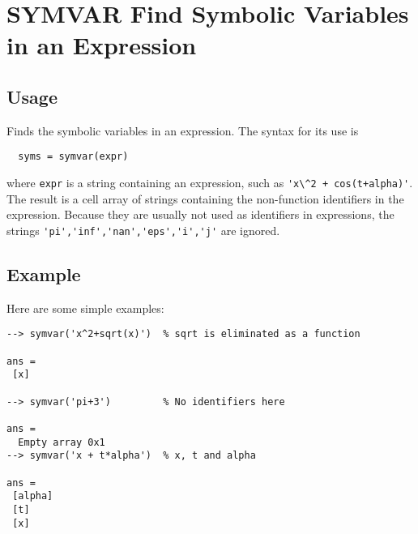 \section{SYMVAR Find Symbolic Variables in an Expression}

\subsection{Usage}

Finds the symbolic variables in an expression.  The syntax for its
use is 
\begin{verbatim}
  syms = symvar(expr)
\end{verbatim}
where \verb|expr| is a string containing an expression, such as
\verb|'x\^2 + cos(t+alpha)'|.  The result is a cell array of strings
containing the non-function identifiers in the expression.  Because
they are usually not used as identifiers in expressions, the strings
 \verb|'pi','inf','nan','eps','i','j'| are ignored.
\subsection{Example}

Here are some simple examples:
\begin{verbatim}
--> symvar('x^2+sqrt(x)')  % sqrt is eliminated as a function

ans = 
 [x] 

--> symvar('pi+3')         % No identifiers here

ans = 
  Empty array 0x1
--> symvar('x + t*alpha')  % x, t and alpha

ans = 
 [alpha] 
 [t] 
 [x] 
\end{verbatim}
